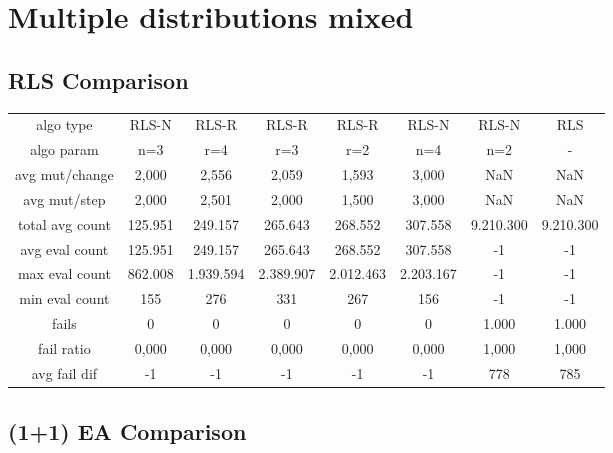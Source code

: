 
\section{Multiple distributions mixed}

\subsection{RLS Comparison}


\begin{tabular}[h]{cccccccc}
algo type&               RLS-N&        RLS-R&        RLS-R&        RLS-R&        RLS-N&        RLS-N&          RLS\\
algo param&                n=3&          r=4&          r=3&          r=2&          n=4&          n=2&            -\\
avg mut/change&          2,000&        2,556&        2,059&        1,593&        3,000&          NaN&          NaN\\
avg mut/step&            2,000&        2,501&        2,000&        1,500&        3,000&          NaN&          NaN\\
\hline
total avg count&       125.951&      249.157&      265.643&      268.552&      307.558&    9.210.300&    9.210.300\\
avg eval count&        125.951&      249.157&      265.643&      268.552&      307.558&           -1&           -1\\
max eval count&        862.008&    1.939.594&    2.389.907&    2.012.463&    2.203.167&           -1&           -1\\
min eval count&            155&          276&          331&          267&          156&           -1&           -1\\
\hline
fails&                       0&            0&            0&            0&            0&        1.000&        1.000\\
fail ratio&              0,000&        0,000&        0,000&        0,000&        0,000&        1,000&        1,000\\
avg fail dif&               -1&           -1&           -1&           -1&           -1&          778&          785\\
\end{tabular}


\subsection{(1+1) EA Comparison}


